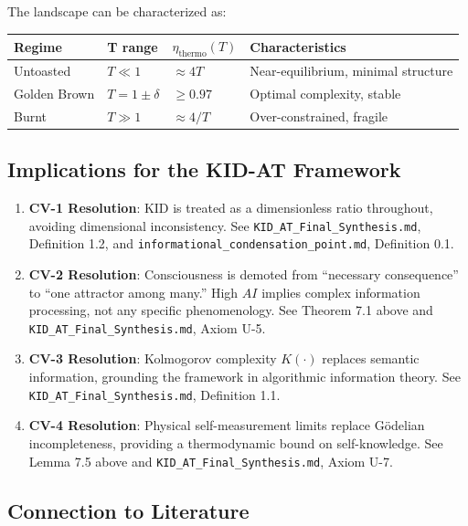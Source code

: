 \documentclass[11pt,a4paper]{article}
\begin{document}
The landscape can be characterized as:

\begin{center}
\begin{tabular}{@{}llll@{}}
\toprule
\textbf{Regime} & \textbf{T range} & $\eta_{\text{thermo}}(T)$ & \textbf{Characteristics} \\
\midrule
Untoasted & $T \ll 1$ & $\approx 4T$ & Near-equilibrium, minimal structure \\
Golden Brown & $T = 1 \pm \delta$ & $\geq 0.97$ & Optimal complexity, stable \\
Burnt & $T \gg 1$ & $\approx 4/T$ & Over-constrained, fragile \\
\bottomrule
\end{tabular}
\end{center}

\subsection{Implications for the KID-AT Framework}

\begin{enumerate}[label=(\roman*)]
\item \textbf{CV-1 Resolution}: KID is treated as a dimensionless ratio throughout, avoiding dimensional inconsistency. See \texttt{KID\_AT\_Final\_Synthesis.md}, Definition 1.2, and \texttt{informational\_condensation\_point.md}, Definition 0.1.
\item \textbf{CV-2 Resolution}: Consciousness is demoted from ``necessary consequence'' to ``one attractor among many.'' High $AI$ implies complex information processing, not any specific phenomenology. See Theorem 7.1 above and \texttt{KID\_AT\_Final\_Synthesis.md}, Axiom U-5.
\item \textbf{CV-3 Resolution}: Kolmogorov complexity $K(\cdot)$ replaces semantic information, grounding the framework in algorithmic information theory. See \texttt{KID\_AT\_Final\_Synthesis.md}, Definition 1.1.
\item \textbf{CV-4 Resolution}: Physical self-measurement limits replace G\"odelian incompleteness, providing a thermodynamic bound on self-knowledge. See Lemma 7.5 above and \texttt{KID\_AT\_Final\_Synthesis.md}, Axiom U-7.
\end{enumerate}

\subsection{Connection to Literature}
\end{document}
